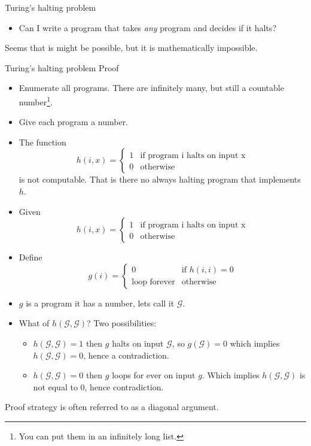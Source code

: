 \documentclass[handout]{beamer}
\begin{document}
\begin{frame}{Turing's halting problem}
  \begin{itemize}
  \item Can I write  a program that takes {\em any} program and
    decides if it halts?
  \end{itemize}
  Seems that is might be possible, but it is mathematically impossible.

 
\end{frame}
\begin{frame}{Turing's halting problem}
Proof
  \begin{itemize}
  \item  Enumerate all programs. There are infinitely many, but still
    a countable number\footnote{You can put them in an infinitely long list.}.
  \item Give each program a number. 
  \item The function
    \[
      h(i,x) = \begin{cases}
               1 & \text{if program i halts on input x} \\
               0 & \text{otherwise}
               \end{cases}
    \]
is not computable. That is there no always halting program that implements
$h$. 
  \end{itemize}
\end{frame}
\begin{frame}
  \begin{itemize}
  \item   Given
    \[
      h(i,x) = \begin{cases}
               1 & \text{if program i halts on input x} \\
               0 & \text{otherwise}
               \end{cases}
    \]
  \item Define
    \[
    g(i) = \begin{cases}
             0 & \text{if $h(i,i) = 0$} \\
             \text{loop forever} & \text{otherwise}
           \end{cases}
    \]
\item $g$ is a program it has a number, lets call it $\mathcal{G}$.
\item What of $h(\mathcal{G},\mathcal{G})$? Two possibilities:
  \begin{itemize}
  \item  $h(\mathcal{G},\mathcal{G}) = 1$ \pause then $g$ halts on input $\mathcal{G}$, so $g(\mathcal{G})=0$ which
    implies $h(\mathcal{G},\mathcal{G}) =  0$, hence a contradiction. \pause
  \item $h(\mathcal{G},\mathcal{G}) = 0$ \pause then $g$ loops for ever on input $g$. Which implies
    $h(\mathcal{G},\mathcal{G})$ is not equal to 0, hence contradiction.
  \end{itemize}
  \end{itemize}
Proof strategy is often referred to as a diagonal argument. 
\end{frame}
\end{document}
